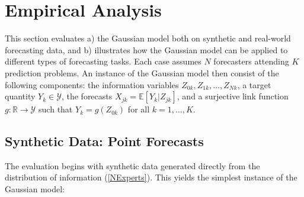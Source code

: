\documentclass[11pt]{article}
\newcommand{\R}{\mathbb{R}}
\newcommand{\E}{\mathbb{E}}
\theoremstyle{definition}
\theoremstyle{definition}
\def\E{{\mathbb E}}
\begin{document}
\section{Empirical Analysis}
\label{empirical}
This section evaluates a) the Gaussian model both on synthetic and real-world forecasting data, and b) illustrates how the Gaussian model can be applied to different types of forecasting tasks. Each case assumes $N$ forecasters attending $K$ prediction problems. An instance of the Gaussian model then consist of the following components: the information variables $Z_{0k}, Z_{1k}, \dots, Z_{Nk}$, a target quantity $Y_k  \in \mathcal{Y}$, the forecasts $X_{jk} = \E[Y_k | Z_{jk}]$, and a surjective link function $g: \R \to \mathcal{Y}$ such that $Y_k = g(Z_{0k})$ for all $k = 1, \dots, K$.
%
%






\subsection{Synthetic Data: Point Forecasts}
\label{simulation}
The evaluation begins with synthetic data generated directly from the distribution of information (\ref{NExperts}). This yields the simplest instance of the Gaussian model:
\end{document}
